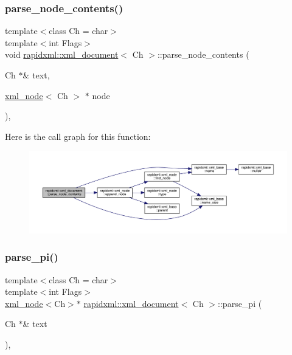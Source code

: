 \subsubsection{\texorpdfstring{parse\_node\_contents()}{parse\_node\_contents()}}
{\footnotesize\ttfamily template$<$class Ch = char$>$ \\
template$<$int Flags$>$ \\
void \mbox{\hyperlink{classrapidxml_1_1xml__document}{rapidxml\+::xml\+\_\+document}}$<$ Ch $>$\+::parse\+\_\+node\+\_\+contents (\begin{DoxyParamCaption}\item[{Ch $\ast$\&}]{text,  }\item[{\mbox{\hyperlink{classrapidxml_1_1xml__node}{xml\+\_\+node}}$<$ Ch $>$ $\ast$}]{node }\end{DoxyParamCaption})\hspace{0.3cm}{\ttfamily [inline]}, {\ttfamily [private]}}

Here is the call graph for this function\+:\nopagebreak
\begin{figure}[H]
\begin{center}
\leavevmode
\includegraphics[width=350pt]{classrapidxml_1_1xml__document_aae0a4c2e1972ab9a9e0ce91cf1166ac9_cgraph}
\end{center}
\end{figure}
\mbox{\label{classrapidxml_1_1xml__document_a09e12a4233a07387d4b5a5ad239388aa}} 
\subsubsection{\texorpdfstring{parse\_pi()}{parse\_pi()}}
{\footnotesize\ttfamily template$<$class Ch = char$>$ \\
template$<$int Flags$>$ \\
\mbox{\hyperlink{classrapidxml_1_1xml__node}{xml\+\_\+node}}$<$Ch$>$$\ast$ \mbox{\hyperlink{classrapidxml_1_1xml__document}{rapidxml\+::xml\+\_\+document}}$<$ Ch $>$\+::parse\+\_\+pi (\begin{DoxyParamCaption}\item[{Ch $\ast$\&}]{text }\end{DoxyParamCaption})\hspace{0.3cm}{\ttfamily [inline]}, {\ttfamily [private]}}

